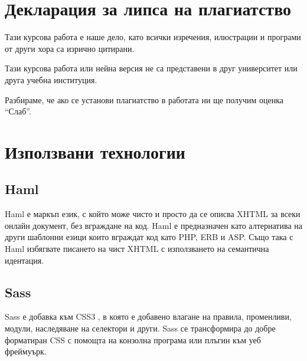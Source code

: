 \documentclass[a4paper]{article}
\begin{document}

\section{Декларация за липса на плагиатство}
Тази курсова работа е наше дело, като всички изречения, илюстрации и програми
от други хора са изрично цитирани.

Тази курсова работа или нейна версия не са представени в друг университет или
друга учебна институция.

Разбираме, че ако се установи плагиатство в работата ни ще получим оценка
“Слаб”.

\section{Използвани технологии}

  \subsection{Haml}
  Haml е \cite{haml} маркъп език, с който може чисто и просто да се описва XHTML за всеки онлайн документ, без вграждане на код. Haml е предназначен като алтернатива на други шаблонни езици които вграждат код като PHP, ERB и ASP. Също така с Haml избягвате писането на чист XHTML с използването на семантична идентация.

  \subsection{Sass}
  Sass \cite{sass} е добавка към CSS3 \cite{css}, в която е добавено влагане на правила, променливи, модули, наследяване на селектори и други. Sass се трансформира до добре форматиран CSS с помощта на конзолна програма или плъгин към уеб фреймуърк.
\end{document}
